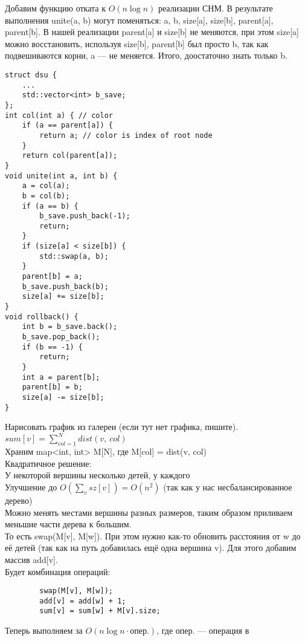 \documentclass[12pt, a4paper]{article}
\begin{document}
    \newpage
    Добавим функцию отката к $O(n\log n)$ реализации СНМ. В результате выполнения unite(a, b) могут поменяться: a, b, size[a], size[b], parent[a], parent[b]. В нашей реализации parent[a] и size[b] не меняются, при этом size[a] можно восстановить, используя size[b], parent[b] был просто b, так как подвешиваются корни, a --- не меняется. Итого, доостаточно знать только b.
    \begin{lstlisting}
struct dsu {
    ...
    std::vector<int> b_save;
};
int col(int a) { // color
    if (a == parent[a]) {
        return a; // color is index of root node
    }
    return col(parent[a]);
}
void unite(int a, int b) {
    a = col(a);
    b = col(b);
    if (a == b) {
        b_save.push_back(-1);
        return;
    }
    if (size[a] < size[b]) {
        std::swap(a, b);
    }
    parent[b] = a;
    b_save.push_back(b);
    size[a] += size[b];
}
void rollback() {
    int b = b_save.back();
    b_save.pop_back();
    if (b == -1) {
        return;
    }
    int a = parent[b];
    parent[b] = b;
    size[a] -= size[b];
}
    \end{lstlisting}
    \newpage
    Нарисовать график из галереи (если тут нет графика, пишите).\\
    $\displaystyle sum[v] = \sum_{col = 1}^{N} dist(v,\ col)$\\
    Храним map<int, int> M[N], где M[col] = dist(v, col)\\
    Квадратичное решение:\\
    У некоторой вершины несколько детей, у каждого \\
    Улучшение до $O\left(\displaystyle\sum_v sz[v]\right) = O(n^2)$ (так как у нас несбалансированное дерево)\\
    Можно менять местами вершины разных размеров, таким образом приливаем меньшие части дерева к большим.\\
    То есть swap(M[v], M[w]). При этом нужно как-то обновить расстояния от w до её детей (так как на путь добавилась ещё одна вершина v). Для этого добавим массив add[v].\\
    Будет комбинация операций:
    \begin{lstlisting}
        swap(M[v], M[w]);
        add[v] = add[w] + 1;
        sum[v] = sum[w] + M[v].size;
    \end{lstlisting}
    Теперь выполняем за $O(n\log n \cdot \text{опер.})$, где опер. --- операция в 
\end{document}
